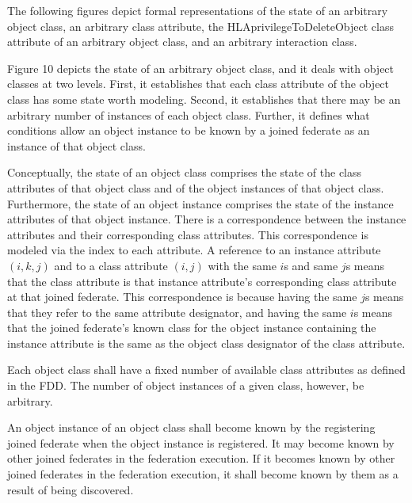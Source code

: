 \begin{compactstdpage}
    The following figures depict formal representations of the state of an arbitrary object class, an arbitrary class attribute, the HLAprivilegeToDeleteObject class attribute of an arbitrary object class, and an arbitrary interaction class.

    Figure 10 depicts the state of an arbitrary object class, and it deals with object classes at two levels. First, it establishes that each class attribute of the object class has some state worth modeling. Second, it establishes that there may be an arbitrary number of instances of each object class. Further, it defines what conditions allow an object instance to be known by a joined federate as an instance of that object class.

    Conceptually, the state of an object class comprises the state of the class attributes of that object class and of the object instances of that object class. Furthermore, the state of an object instance comprises the state of the instance attributes of that object instance. There is a correspondence between the instance attributes and their corresponding class attributes. This correspondence is modeled via the index to each attribute. A reference to an instance attribute $(i,k,j)$ and to a class attribute $(i,j)$ with the same $i$s and same $j$s means that the class attribute is that instance attribute's corresponding class attribute at that joined federate. This correspondence is because having the same $j$s means that they refer to the same attribute designator, and having the same $i$s means that the joined federate's known class for the object instance containing the instance attribute is the same as the object class designator of the class attribute.

    Each object class shall have a fixed number of available class attributes as defined in the FDD. The number of object instances of a given class, however, be arbitrary.

    An object instance of an object class shall become known by the registering joined federate when the object instance is registered. It may become known by other joined federates in the federation execution. If it becomes known by other joined federates in the federation execution, it shall become known by them as a result of being discovered.
\end{compactstdpage}

\clearpage

\vspace*{-14pt}

